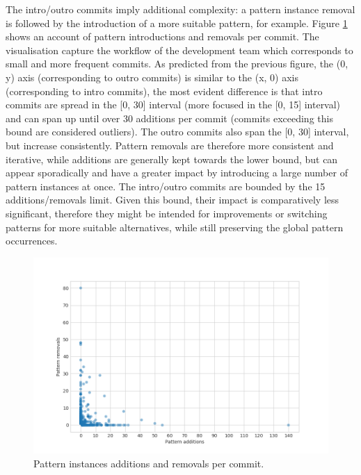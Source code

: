 The intro/outro commits imply additional complexity: a pattern instance removal is followed by the introduction of a more suitable pattern, for example. Figure \ref{fig:add_rem_commit} shows an account of pattern introductions and removals per commit. The visualisation capture the workflow of the development team which corresponds to small and more frequent commits. As predicted from the previous figure, the (0, y) axis (corresponding to outro commits) is similar to the (x, 0) axis (corresponding to intro commits), the most evident difference is that intro commits are spread in the [0, 30] interval (more focused in the [0, 15] interval) and can span up until over 30 additions per commit (commits exceeding this bound are considered outliers). The outro commits also span the [0, 30] interval, but increase consistently. Pattern removals are therefore more consistent and iterative, while additions are generally kept towards the lower bound, but can appear sporadically and have a greater impact by introducing a large number of pattern instances at once. The intro/outro commits are bounded by the 15 additions/removals limit. Given this bound, their impact is comparatively less significant, therefore they might be intended for improvements or switching patterns for more suitable alternatives, while still preserving the global pattern occurrences. 
\begin{figure}[H]
    \centering
    \includegraphics[width =\textwidth]{images/graphs/additions_removals_commit.png}
    \caption{Pattern instances additions and removals per commit.}
    \label{fig:add_rem_commit}
\end{figure}

